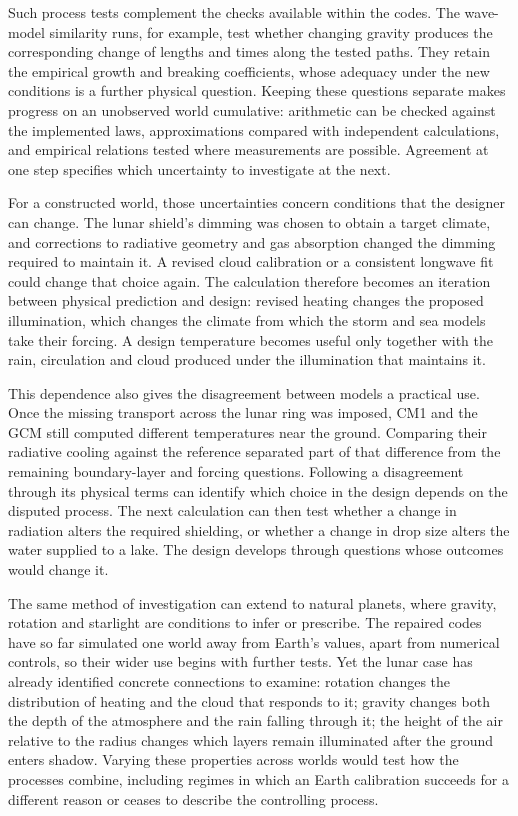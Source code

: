 Such process tests complement the checks available within the codes. The wave-model similarity runs, for
example, test whether changing gravity produces the corresponding change of lengths and times along the
tested paths. They retain the empirical growth and breaking coefficients, whose adequacy under the new
conditions is a further physical question. Keeping these questions separate makes progress on an unobserved
world cumulative: arithmetic can be checked against the implemented laws, approximations compared with
independent calculations, and empirical relations tested where measurements are possible. Agreement at one
step specifies which uncertainty to investigate at the next.

For a constructed world, those uncertainties concern conditions that the designer can change. The lunar
shield's dimming was chosen to obtain a target climate, and corrections to radiative geometry and gas
absorption changed the dimming required to maintain it. A revised cloud calibration or a consistent longwave
fit could change that choice again. The calculation therefore becomes an iteration between physical
prediction and design: revised heating changes the proposed illumination, which changes the climate from
which the storm and sea models take their forcing. A design temperature becomes useful only together with
the rain, circulation and cloud produced under the illumination that maintains it.

This dependence also gives the disagreement between models a practical use. Once the missing transport across
the lunar ring was imposed, CM1 and the GCM still computed different temperatures near the ground. Comparing
their radiative cooling against the reference separated part of that difference from the remaining boundary-layer
and forcing questions. Following a disagreement through its physical terms can identify which choice in the
design depends on the disputed process. The next calculation can then test whether a change in radiation
alters the required shielding, or whether a change in drop size alters the water supplied to a lake. The
design develops through questions whose outcomes would change it.

The same method of investigation can extend to natural planets, where gravity, rotation and starlight are
conditions to infer or prescribe. The repaired codes have so far simulated one world away from Earth's
values, apart from numerical controls, so their wider use begins with further tests. Yet the lunar case has
already identified concrete connections to examine: rotation changes the distribution of heating and the
cloud that responds to it; gravity changes both the depth of the atmosphere and the rain falling through it;
the height of the air relative to the radius changes which layers remain illuminated after the ground enters
shadow. Varying these properties across worlds would test how the processes combine, including regimes in
which an Earth calibration succeeds for a different reason or ceases to describe the controlling process.

